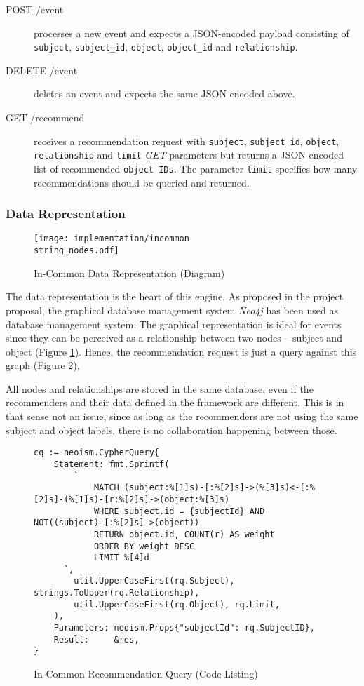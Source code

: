 \begin{description}
    \item[POST /event] processes a new event and expects a JSON-encoded payload consisting of \texttt{subject}, \texttt{subject_id}, \texttt{object}, \texttt{object_id} and \texttt{relationship}.
    \item[DELETE /event] deletes an event and expects the same JSON-encoded above.
    \item[GET /recommend] receives a recommendation request with \texttt{subject}, \texttt{subject_id}, \texttt{object}, \texttt{relationship} and \texttt{limit} \emph{GET} parameters but returns a JSON-encoded list of recommended \texttt{object IDs}. The parameter \texttt{limit} specifies how many recommendations should be queried and returned.
\end{description}

\subsubsection{Data Representation}

\begin{figure}[ht]
    \texttt{[image: implementation/incommon\\string\_nodes.pdf]}
    \caption{In-Common Data Representation (Diagram)}
    \label{fig:implementation-incommon-nodes}
\end{figure}

The data representation is the heart of this engine. As proposed in the project proposal, the graphical database management system \emph{Neo4j} has been used as database management system. The graphical representation is ideal for events since they can be perceived as a relationship between two nodes -- subject and object (Figure \ref{fig:implementation-incommon-nodes}). Hence, the recommendation request is just a query against this graph (Figure \ref{fig:implementation-incommon-recommendation-query}).

All nodes and relationships are stored in the same database, even if the recommenders and their data defined in the framework are different. This is in that sense not an issue, since as long as the recommenders are not using the same subject and object labels, there is no collaboration happening between those.

\begin{figure}[!ht]
    \begin{verbatim}
cq := neoism.CypherQuery{
    Statement: fmt.Sprintf(
        `
            MATCH (subject:%[1]s)-[:%[2]s]->(%[3]s)<-[:%[2]s]-(%[1]s)-[r:%[2]s]->(object:%[3]s)
            WHERE subject.id = {subjectId} AND NOT((subject)-[:%[2]s]->(object))
            RETURN object.id, COUNT(r) AS weight
            ORDER BY weight DESC
            LIMIT %[4]d
      `,
        util.UpperCaseFirst(rq.Subject), strings.ToUpper(rq.Relationship),
        util.UpperCaseFirst(rq.Object), rq.Limit,
    ),
    Parameters: neoism.Props{"subjectId": rq.SubjectID},
    Result:     &res,
}
    \end{verbatim}
    \caption{In-Common Recommendation Query (Code Listing)}
    \label{fig:implementation-incommon-recommendation-query}
\end{figure}

